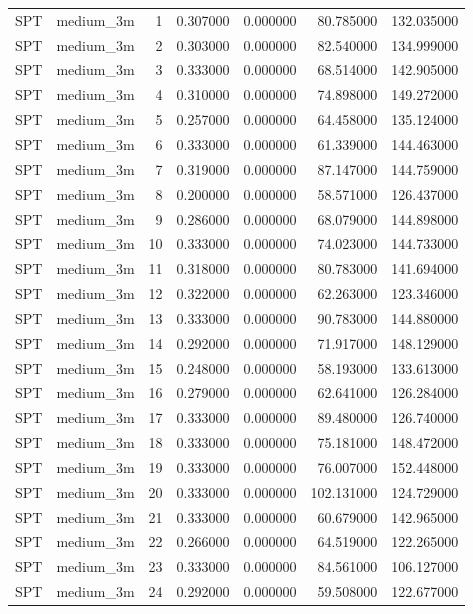 \begin{tabular}{llrrrrr}
SPT & medium_3m & 1 & 0.307000 & 0.000000 & 80.785000 & 132.035000 \\
SPT & medium_3m & 2 & 0.303000 & 0.000000 & 82.540000 & 134.999000 \\
SPT & medium_3m & 3 & 0.333000 & 0.000000 & 68.514000 & 142.905000 \\
SPT & medium_3m & 4 & 0.310000 & 0.000000 & 74.898000 & 149.272000 \\
SPT & medium_3m & 5 & 0.257000 & 0.000000 & 64.458000 & 135.124000 \\
SPT & medium_3m & 6 & 0.333000 & 0.000000 & 61.339000 & 144.463000 \\
SPT & medium_3m & 7 & 0.319000 & 0.000000 & 87.147000 & 144.759000 \\
SPT & medium_3m & 8 & 0.200000 & 0.000000 & 58.571000 & 126.437000 \\
SPT & medium_3m & 9 & 0.286000 & 0.000000 & 68.079000 & 144.898000 \\
SPT & medium_3m & 10 & 0.333000 & 0.000000 & 74.023000 & 144.733000 \\
SPT & medium_3m & 11 & 0.318000 & 0.000000 & 80.783000 & 141.694000 \\
SPT & medium_3m & 12 & 0.322000 & 0.000000 & 62.263000 & 123.346000 \\
SPT & medium_3m & 13 & 0.333000 & 0.000000 & 90.783000 & 144.880000 \\
SPT & medium_3m & 14 & 0.292000 & 0.000000 & 71.917000 & 148.129000 \\
SPT & medium_3m & 15 & 0.248000 & 0.000000 & 58.193000 & 133.613000 \\
SPT & medium_3m & 16 & 0.279000 & 0.000000 & 62.641000 & 126.284000 \\
SPT & medium_3m & 17 & 0.333000 & 0.000000 & 89.480000 & 126.740000 \\
SPT & medium_3m & 18 & 0.333000 & 0.000000 & 75.181000 & 148.472000 \\
SPT & medium_3m & 19 & 0.333000 & 0.000000 & 76.007000 & 152.448000 \\
SPT & medium_3m & 20 & 0.333000 & 0.000000 & 102.131000 & 124.729000 \\
SPT & medium_3m & 21 & 0.333000 & 0.000000 & 60.679000 & 142.965000 \\
SPT & medium_3m & 22 & 0.266000 & 0.000000 & 64.519000 & 122.265000 \\
SPT & medium_3m & 23 & 0.333000 & 0.000000 & 84.561000 & 106.127000 \\
SPT & medium_3m & 24 & 0.292000 & 0.000000 & 59.508000 & 122.677000 \\

\end{tabular}

